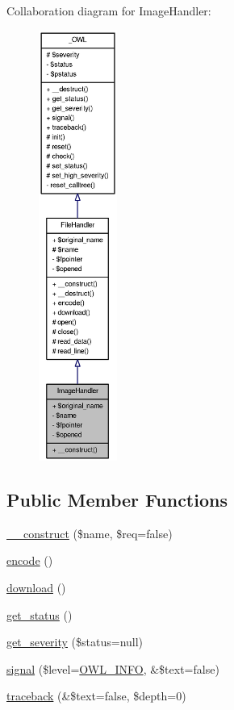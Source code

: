 Collaboration diagram for ImageHandler:\nopagebreak
\begin{figure}[H]
\begin{center}
\leavevmode
\includegraphics[height=400pt]{classImageHandler__coll__graph}
\end{center}
\end{figure}
\subsection*{Public Member Functions}
\begin{DoxyCompactItemize}
\item 
\hyperlink{classImageHandler_aa61dc81d4cf98eed31b32e2197018309}{\_\-\_\-construct} (\$name, \$req=false)
\item 
\hyperlink{classFileHandler_aa29360bf94fd54d906256561f33d93ad}{encode} ()
\item 
\hyperlink{classFileHandler_ac17edc9b92643c32ae6040b1235c64dd}{download} ()
\item 
\hyperlink{class__OWL_a99ec771fa2c5c279f80152cc09e489a8}{get\_\-status} ()
\item 
\hyperlink{class__OWL_adf9509ef96858be7bdd9414c5ef129aa}{get\_\-severity} (\$status=null)
\item 
\hyperlink{class__OWL_a51ba4a16409acf2a2f61f286939091a5}{signal} (\$level=\hyperlink{owl_8severitycodes_8php_a139328861128689f2f4def6a399d9057}{OWL\_\-INFO}, \&\$text=false)
\item 
\hyperlink{class__OWL_aa29547995d6741b7d2b90c1d4ea99a13}{traceback} (\&\$text=false, \$depth=0)
\end{DoxyCompactItemize}
